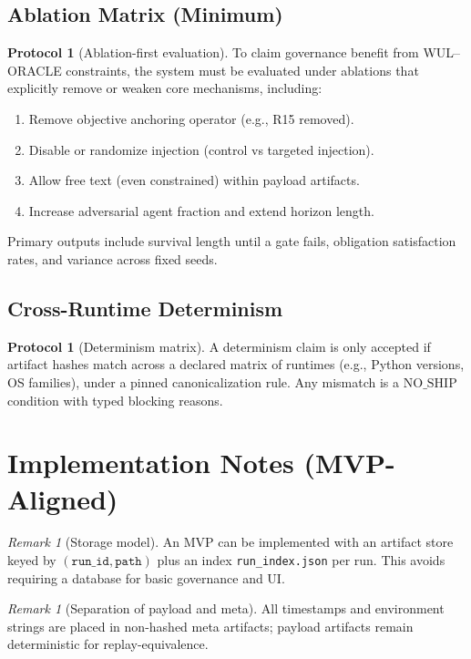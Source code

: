 \documentclass[11pt,a4paper]{article}
\theoremstyle{plain}
\theoremstyle{definition}
\newtheorem{protocol}[theorem]{Protocol}
\theoremstyle{remark}
\newtheorem{remark}[theorem]{Remark}
\newcommand{\NOSHIP}{\mathrm{NO\_SHIP}}
\begin{document}
\subsection{Ablation Matrix (Minimum)}
\begin{protocol}[Ablation-first evaluation]
\label{prot:ablation}
To claim governance benefit from WUL--ORACLE constraints, the system must be evaluated under ablations that explicitly remove or weaken core mechanisms, including:
\begin{enumerate}[label=(\alph*)]
  \item Remove objective anchoring operator (e.g., R15 removed).
  \item Disable or randomize injection (control vs targeted injection).
  \item Allow free text (even constrained) within payload artifacts.
  \item Increase adversarial agent fraction and extend horizon length.
\end{enumerate}
Primary outputs include survival length until a gate fails, obligation satisfaction rates, and variance across fixed seeds.
\end{protocol}

\subsection{Cross-Runtime Determinism}
\begin{protocol}[Determinism matrix]
A determinism claim is only accepted if artifact hashes match across a declared matrix of runtimes (e.g., Python versions, OS families), under a pinned canonicalization rule. Any mismatch is a \(\NOSHIP\) condition with typed blocking reasons.
\end{protocol}

\section{Implementation Notes (MVP-Aligned)}
\begin{remark}[Storage model]
An MVP can be implemented with an artifact store keyed by \((\texttt{run\_id},\texttt{path})\) plus an index \texttt{run\_index.json} per run. This avoids requiring a database for basic governance and UI.
\end{remark}

\begin{remark}[Separation of payload and meta]
All timestamps and environment strings are placed in non-hashed meta artifacts; payload artifacts remain deterministic for replay-equivalence.
\end{remark}
\end{document}
